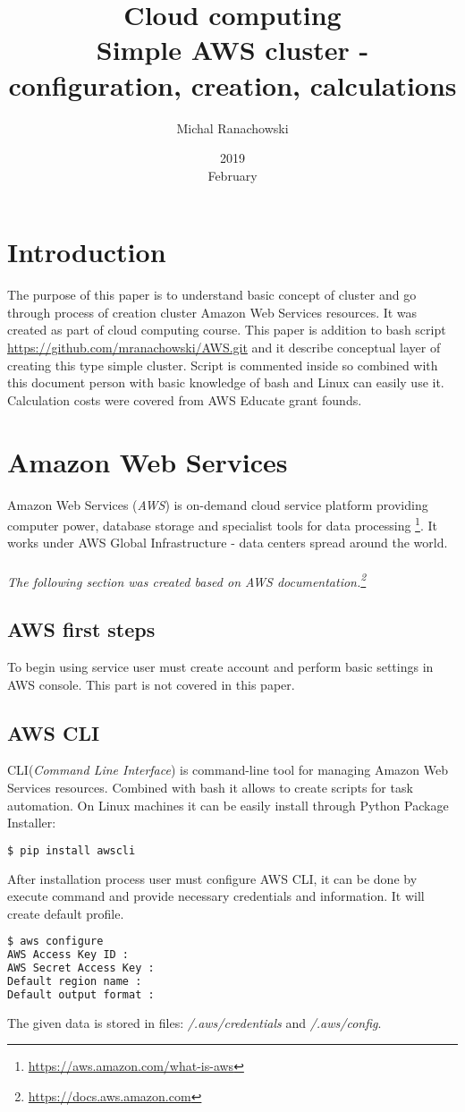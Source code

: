 \documentclass[11pt]{article}
\title{\Huge{Cloud computing} \\ \huge{Simple AWS cluster - configuration, creation, calculations}}
\author{Michal Ranachowski}
\date{2019\\ February}
\begin{document}
\maketitle

\section{Introduction}
The purpose of this paper is to understand basic concept of cluster and go through process of creation cluster Amazon Web Services resources. It was created as part of cloud computing course. This paper is addition to bash script \url{https://github.com/mranachowski/AWS.git} and it describe conceptual layer of creating this type simple cluster. Script is commented inside so combined with this document person with basic knowledge of bash and Linux can easily use it. Calculation costs were covered from AWS Educate grant founds. 

\section{Amazon Web Services}
Amazon Web Services (\textit{AWS}) is on-demand cloud service platform providing computer power, database storage and specialist tools for data processing \footnote{\url{https://aws.amazon.com/what-is-aws}}. It works under AWS Global Infrastructure - data centers spread around the world.\\ \\
\textit{The following section was created based on AWS documentation.\footnote{\url{https://docs.aws.amazon.com}}}

\subsection{AWS first steps}
To begin using service user must create account and perform basic settings in AWS console. This part is not covered in this paper.

\subsection{AWS CLI}
CLI(\textit{Command Line Interface}) is command-line tool for managing Amazon Web Services resources. Combined with bash it allows to create scripts for task automation. On Linux machines it can be easily install through Python Package Installer:
\begin{lstlisting}[language=bash]
$ pip install awscli
\end{lstlisting}
After installation process user must configure AWS CLI, it can be done by execute command and provide necessary credentials and information. It will create default profile.
\begin{lstlisting}[language=bash]
$ aws configure
AWS Access Key ID : 
AWS Secret Access Key : 
Default region name : 
Default output format : 
\end{lstlisting}
The given data is stored in files: \textit{/.aws/credentials} and \textit{/.aws/config}.
\end{document}

